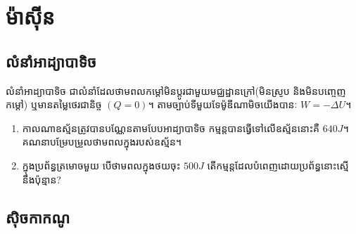 \chapter{ម៉ាសុីន}
\section{លំនាំអាដ្យាបាទិច}
\begin{definition}
	លំនាំអាដ្យាបាទិច ជាលំនាំដែលថាមពលកម្តៅមិនប្តូរជាមួយមជ្ឈដ្ឋានក្រៅ(មិនស្រូប និងមិនបញ្ចេញកម្តៅ) ឬមានតម្លៃថេរជានិច្ច $\left(Q=0\right)$។ តាមច្បាប់ទីមួយទែម៉ូឌីណាមិចយើងបានៈ $W=-\Delta U$។
\end{definition}
\begin{example}
	\begin{enumerate}[m]
		\item កាលណាឧស្ម័នត្រូវបានបណ្ណែនតាមបែបអាដ្យាបាទិច កម្មន្តបានធ្វើទៅលើឧស្ម័ននោះគឺ $640J$។\\ គណនាបម្រែបម្រួលថាមពលក្នុងរបស់ឧស្ម័ន។
		\item ក្នុងប្រព័ន្ធត្រមោចមួយ បើថាមពលក្នុងថយចុះ $500J$ តើកម្មន្តដែលបំពេញដោយប្រព័ន្ធនោះស្មើនឹងប៉ុន្មាន?
	\end{enumerate}
\end{example}
\section{សុិចកាកណូ}
